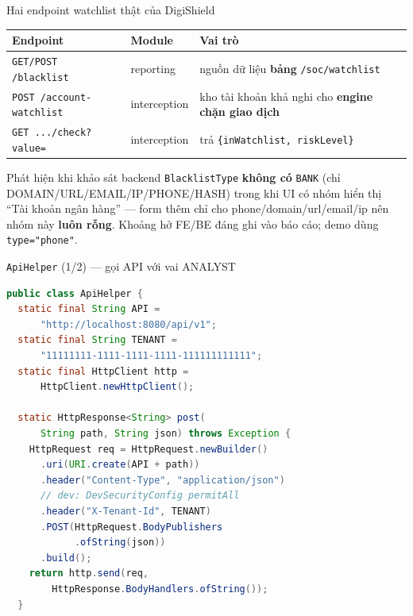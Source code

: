 \documentclass[aspectratio=169,12pt]{beamer}
\begin{document}
\begin{frame}{Hai endpoint watchlist thật của DigiShield}
  \begin{center}
  \footnotesize
  \begin{tabular}{p{4.5cm}p{2.3cm}p{4.5cm}}
    \toprule
    \textbf{Endpoint} & \textbf{Module} & \textbf{Vai trò} \\
    \midrule
    \texttt{GET/POST /blacklist} & reporting
      & nguồn dữ liệu \textbf{bảng} \texttt{/soc/watchlist} \\
    \texttt{POST /account-watchlist} & interception
      & kho tài khoản khả nghi cho \textbf{engine chặn giao dịch} \\
    \texttt{GET .../check?value=} & interception
      & trả \texttt{\{inWatchlist, riskLevel\}} \\
    \bottomrule
  \end{tabular}
  \end{center}

  \begin{alertblock}{Phát hiện khi khảo sát backend}
    \texttt{BlacklistType} \textbf{không có} \texttt{BANK} (chỉ
    DOMAIN/URL/EMAIL/IP/PHONE/HASH) trong khi UI có nhóm hiển thị ``Tài
    khoản ngân hàng'' --- form thêm chỉ cho phone/domain/url/email/ip nên
    nhóm này \textbf{luôn rỗng}. Khoảng hở FE/BE đáng ghi vào báo cáo;
    demo dùng \texttt{type="phone"}.
  \end{alertblock}
\end{frame}

\begin{frame}[fragile]{\texttt{ApiHelper} (1/2) --- gọi API với vai ANALYST}
\begin{lstlisting}[language=Java,basicstyle=\ttfamily\scriptsize]
public class ApiHelper {
  static final String API =
      "http://localhost:8080/api/v1";
  static final String TENANT =
      "11111111-1111-1111-1111-111111111111";
  static final HttpClient http =
      HttpClient.newHttpClient();

  static HttpResponse<String> post(
      String path, String json) throws Exception {
    HttpRequest req = HttpRequest.newBuilder()
      .uri(URI.create(API + path))
      .header("Content-Type", "application/json")
      // dev: DevSecurityConfig permitAll
      .header("X-Tenant-Id", TENANT)
      .POST(HttpRequest.BodyPublishers
            .ofString(json))
      .build();
    return http.send(req,
        HttpResponse.BodyHandlers.ofString());
  }
\end{lstlisting}
\end{frame}
\end{document}
